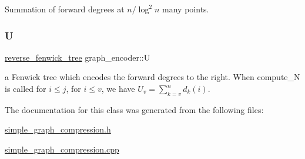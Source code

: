 Summation of forward degrees at $n / \log^2 n$ many points. 

\mbox{\label{classgraph__encoder_a3314c40920f2ee132958a6b0ce7e7995}} 
\subsubsection{\texorpdfstring{U}{U}}
{\footnotesize\ttfamily \hyperlink{classreverse__fenwick__tree}{reverse\+\_\+fenwick\+\_\+tree} graph\+\_\+encoder\+::U\hspace{0.3cm}{\ttfamily [private]}}



a Fenwick tree which encodes the forward degrees to the right. When compute\+\_\+N is called for $i \leq j$, for $i \leq v$, we have $U_v = \sum_{k=v}^n d_k(i)$. 



The documentation for this class was generated from the following files\+:\begin{DoxyCompactItemize}
\item 
\hyperlink{simple__graph__compression_8h}{simple\+\_\+graph\+\_\+compression.\+h}\item 
\hyperlink{simple__graph__compression_8cpp}{simple\+\_\+graph\+\_\+compression.\+cpp}\end{DoxyCompactItemize}
